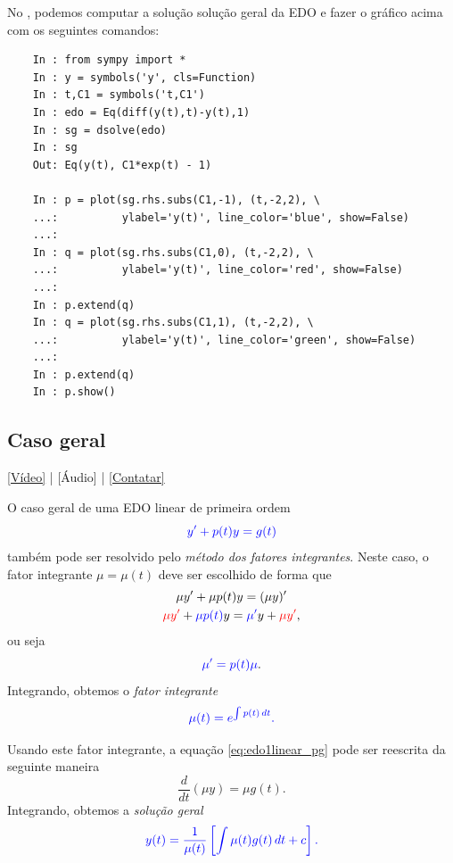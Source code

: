 \begin{ex}
  \ifispython
  No \python, podemos computar a solução solução geral da EDO e fazer o gráfico acima com os seguintes comandos:
  \begin{lstlisting}
    In : from sympy import *
    In : y = symbols('y', cls=Function)
    In : t,C1 = symbols('t,C1')
    In : edo = Eq(diff(y(t),t)-y(t),1)
    In : sg = dsolve(edo)
    In : sg
    Out: Eq(y(t), C1*exp(t) - 1)
    
    In : p = plot(sg.rhs.subs(C1,-1), (t,-2,2), \
    ...:          ylabel='y(t)', line_color='blue', show=False)
    ...: 
    In : q = plot(sg.rhs.subs(C1,0), (t,-2,2), \
    ...:          ylabel='y(t)', line_color='red', show=False)
    ...: 
    In : p.extend(q)
    In : q = plot(sg.rhs.subs(C1,1), (t,-2,2), \
    ...:          ylabel='y(t)', line_color='green', show=False)
    ...: 
    In : p.extend(q)
    In : p.show()
  \end{lstlisting}
  \fi
\end{ex}

\subsection{Caso geral}

\begin{flushright}
  \href{https://archive.org/details/edo-ordem-1-linear}{[Vídeo]} | [Áudio] | \href{https://phkonzen.github.io/notas/contato.html}{[Contatar]}
\end{flushright}

O caso geral de uma EDO linear de primeira ordem
\begin{equation}\label{eq:edo1linear_pg}
  \color{blue}{y' + p(t)y = g(t)}
\end{equation}
também pode ser resolvido pelo \emph{método dos fatores integrantes}. Neste caso, o fator integrante $\mu = \mu(t)$ deve ser escolhido de forma que
\begin{gather}
  \mu y' + \mu p(t)y = (\mu y)'\\
      {\color{red}\mu y'} + {\color{blue}\mu p(t)}y = {\color{blue}\mu'}y + {\color{red}\mu y'},
\end{gather}
ou seja
\begin{equation}
  {\color{blue}\mu' = p(t)\mu}.
\end{equation}
Integrando, obtemos o \emph{fator integrante}
\begin{equation}
  \color{blue}{\mu(t) = e^{\int p(t)\,dt}.}
\end{equation}

Usando este fator integrante, a equação \eqref{eq:edo1linear_pg} pode ser reescrita da seguinte maneira
\begin{equation}
  \frac{d}{dt}\left(\mu y\right) = \mu g(t).
\end{equation}
Integrando, obtemos a \emph{solução geral}
\begin{equation}
  \color{blue}{y(t) = \frac{1}{\mu(t)}\left[\int \mu(t) g(t)\,dt + c\right].}
\end{equation}

